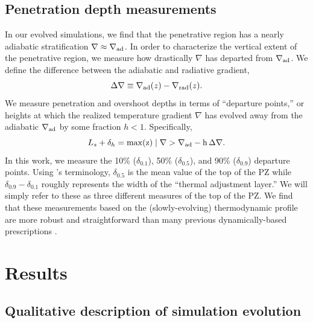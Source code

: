 \documentclass[twocolumn]{aastex631}
\newcommand{\gradrad}{\ensuremath{\nabla_{\rm{rad}}}}
\newcommand{\gradad}{\ensuremath{\nabla_{\rm{ad}}}}
\newcommand{\justgrad}{\ensuremath{\nabla}}
\begin{document}
\subsection{Penetration depth measurements}
In our evolved simulations, we find that the penetrative region has a nearly adiabatic stratification $\justgrad \approx \gradad$.
In order to characterize the vertical extent of the penetrative region, we measure how drastically $\justgrad$ has departed from $\gradad$.
We define the difference between the adiabatic and radiative gradient,
\begin{equation}
\Delta\justgrad \equiv \gradad(z) - \gradrad(z).
\end{equation}
We measure penetration and overshoot depths in terms of ``departure points,'' or heights at which the realized temperature gradient $\justgrad$ has evolved away from the adiabatic $\gradad$ by some fraction $h < 1$.
Specifically,
\begin{equation}
L_s + \delta_{h} = \rm{max}(z) \mid \justgrad > \gradad - h\,\Delta\justgrad.
\label{eqn:delta_p_measures}
\end{equation}
In this work, we measure the 10\% ($\delta_{0.1}$), 50\% ($\delta_{0.5}$), and 90\% ($\delta_{0.9}$) departure points.
Using \citet{zahn1991}'s terminology, $\delta_{0.5}$ is the mean value of the top of the PZ while $\delta_{0.9} - \delta_{0.1}$ roughly represents the width of the ``thermal adjustment layer.''
We will simply refer to these as three different measures of the top of the PZ.
We find that these measurements based on the (slowly-evolving) thermodynamic profile are more robust and straightforward than many previous dynamically-based prescriptions \citep[see e.g.,][for a nice discussion]{pratt_etal_2017}.

\section{Results}
\label{sec:results}

\subsection{Qualitative description of simulation evolution}
\end{document}
